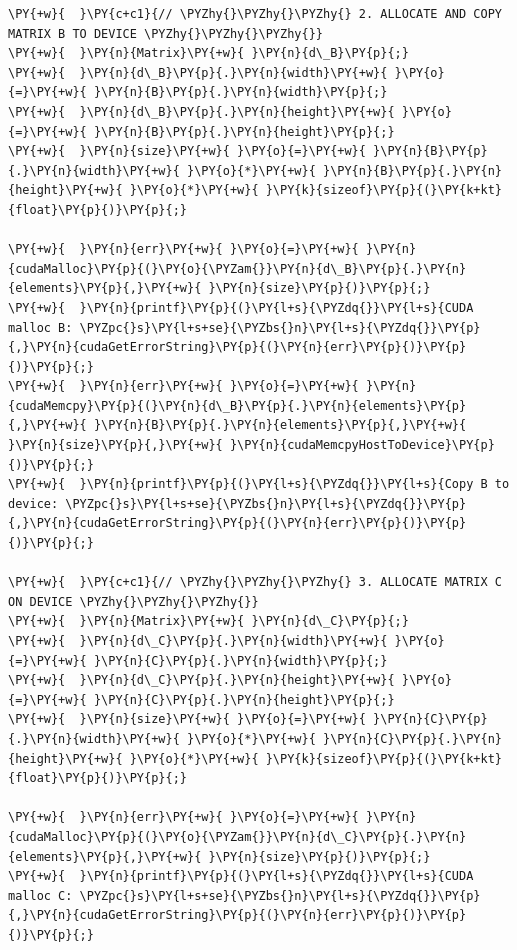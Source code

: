 \begin{Verbatim}[label=\makebox{\url{https://github.com/lucabaldini/cmepda/tree/master/slides/latex/snippets/MatrixMultiplication_global.cu}},commandchars=\\\{\}]
\PY{+w}{  }\PY{c+c1}{// \PYZhy{}\PYZhy{}\PYZhy{} 2. ALLOCATE AND COPY MATRIX B TO DEVICE \PYZhy{}\PYZhy{}\PYZhy{}}
\PY{+w}{  }\PY{n}{Matrix}\PY{+w}{ }\PY{n}{d\_B}\PY{p}{;}
\PY{+w}{  }\PY{n}{d\_B}\PY{p}{.}\PY{n}{width}\PY{+w}{ }\PY{o}{=}\PY{+w}{ }\PY{n}{B}\PY{p}{.}\PY{n}{width}\PY{p}{;}
\PY{+w}{  }\PY{n}{d\_B}\PY{p}{.}\PY{n}{height}\PY{+w}{ }\PY{o}{=}\PY{+w}{ }\PY{n}{B}\PY{p}{.}\PY{n}{height}\PY{p}{;}
\PY{+w}{  }\PY{n}{size}\PY{+w}{ }\PY{o}{=}\PY{+w}{ }\PY{n}{B}\PY{p}{.}\PY{n}{width}\PY{+w}{ }\PY{o}{*}\PY{+w}{ }\PY{n}{B}\PY{p}{.}\PY{n}{height}\PY{+w}{ }\PY{o}{*}\PY{+w}{ }\PY{k}{sizeof}\PY{p}{(}\PY{k+kt}{float}\PY{p}{)}\PY{p}{;}

\PY{+w}{  }\PY{n}{err}\PY{+w}{ }\PY{o}{=}\PY{+w}{ }\PY{n}{cudaMalloc}\PY{p}{(}\PY{o}{\PYZam{}}\PY{n}{d\_B}\PY{p}{.}\PY{n}{elements}\PY{p}{,}\PY{+w}{ }\PY{n}{size}\PY{p}{)}\PY{p}{;}
\PY{+w}{  }\PY{n}{printf}\PY{p}{(}\PY{l+s}{\PYZdq{}}\PY{l+s}{CUDA malloc B: \PYZpc{}s}\PY{l+s+se}{\PYZbs{}n}\PY{l+s}{\PYZdq{}}\PY{p}{,}\PY{n}{cudaGetErrorString}\PY{p}{(}\PY{n}{err}\PY{p}{)}\PY{p}{)}\PY{p}{;}
\PY{+w}{  }\PY{n}{err}\PY{+w}{ }\PY{o}{=}\PY{+w}{ }\PY{n}{cudaMemcpy}\PY{p}{(}\PY{n}{d\_B}\PY{p}{.}\PY{n}{elements}\PY{p}{,}\PY{+w}{ }\PY{n}{B}\PY{p}{.}\PY{n}{elements}\PY{p}{,}\PY{+w}{ }\PY{n}{size}\PY{p}{,}\PY{+w}{ }\PY{n}{cudaMemcpyHostToDevice}\PY{p}{)}\PY{p}{;}
\PY{+w}{  }\PY{n}{printf}\PY{p}{(}\PY{l+s}{\PYZdq{}}\PY{l+s}{Copy B to device: \PYZpc{}s}\PY{l+s+se}{\PYZbs{}n}\PY{l+s}{\PYZdq{}}\PY{p}{,}\PY{n}{cudaGetErrorString}\PY{p}{(}\PY{n}{err}\PY{p}{)}\PY{p}{)}\PY{p}{;}

\PY{+w}{  }\PY{c+c1}{// \PYZhy{}\PYZhy{}\PYZhy{} 3. ALLOCATE MATRIX C ON DEVICE \PYZhy{}\PYZhy{}\PYZhy{}}
\PY{+w}{  }\PY{n}{Matrix}\PY{+w}{ }\PY{n}{d\_C}\PY{p}{;}
\PY{+w}{  }\PY{n}{d\_C}\PY{p}{.}\PY{n}{width}\PY{+w}{ }\PY{o}{=}\PY{+w}{ }\PY{n}{C}\PY{p}{.}\PY{n}{width}\PY{p}{;}
\PY{+w}{  }\PY{n}{d\_C}\PY{p}{.}\PY{n}{height}\PY{+w}{ }\PY{o}{=}\PY{+w}{ }\PY{n}{C}\PY{p}{.}\PY{n}{height}\PY{p}{;}
\PY{+w}{  }\PY{n}{size}\PY{+w}{ }\PY{o}{=}\PY{+w}{ }\PY{n}{C}\PY{p}{.}\PY{n}{width}\PY{+w}{ }\PY{o}{*}\PY{+w}{ }\PY{n}{C}\PY{p}{.}\PY{n}{height}\PY{+w}{ }\PY{o}{*}\PY{+w}{ }\PY{k}{sizeof}\PY{p}{(}\PY{k+kt}{float}\PY{p}{)}\PY{p}{;}

\PY{+w}{  }\PY{n}{err}\PY{+w}{ }\PY{o}{=}\PY{+w}{ }\PY{n}{cudaMalloc}\PY{p}{(}\PY{o}{\PYZam{}}\PY{n}{d\_C}\PY{p}{.}\PY{n}{elements}\PY{p}{,}\PY{+w}{ }\PY{n}{size}\PY{p}{)}\PY{p}{;}
\PY{+w}{  }\PY{n}{printf}\PY{p}{(}\PY{l+s}{\PYZdq{}}\PY{l+s}{CUDA malloc C: \PYZpc{}s}\PY{l+s+se}{\PYZbs{}n}\PY{l+s}{\PYZdq{}}\PY{p}{,}\PY{n}{cudaGetErrorString}\PY{p}{(}\PY{n}{err}\PY{p}{)}\PY{p}{)}\PY{p}{;}


\end{Verbatim}
